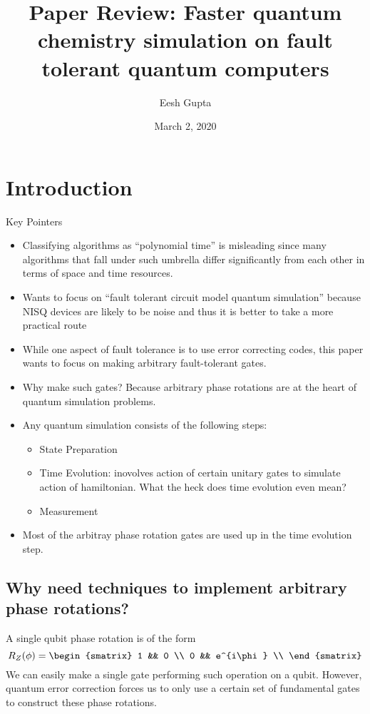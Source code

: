 \documentclass{article}
\title{Paper Review: Faster quantum chemistry simulation on fault tolerant quantum computers}
\author{Eesh Gupta }
\date{March 2, 2020}
\begin{document}
\maketitle
\section{Introduction}


Key Pointers
\begin{itemize}
  \item Classifying algorithms as ``polynomial time'' is misleading since
  many algorithms that fall under such umbrella differ significantly from
  each other in terms of space and time resources.
  \item Wants to focus on ``fault tolerant circuit model quantum
  simulation'' because NISQ devices are likely to be noise and thus it is
  better to take a more practical route
  \item While one aspect of fault tolerance is to use error correcting codes,
  this paper wants to focus on making arbitrary fault-tolerant gates.
  \item Why make such gates? Because arbitrary phase rotations are at the
  heart of quantum simulation problems.

  \item Any quantum simulation consists of the following steps:
    \begin{itemize}
      \item State Preparation
      \item Time Evolution: inovolves action of certain unitary gates to
      simulate action of hamiltonian. What the heck does time evolution
      even mean?
      \item Measurement
    \end{itemize}
  \item Most of the arbitray phase rotation gates are used up in the time
  evolution step.
  \end{itemize}

\subsection{Why need techniques to implement arbitrary phase rotations?}
A single qubit phase rotation is of the form
\[R_Z(\phi)
=
\begin{smatrix}
  1 && 0 \\
  0 && e^{i\phi} \\
\end{smatrix}
\]
We can easily make a single gate performing such operation on a qubit. However,
quantum error correction forces us to only use a certain set of fundamental
gates to construct these phase rotations.
\end{document}
